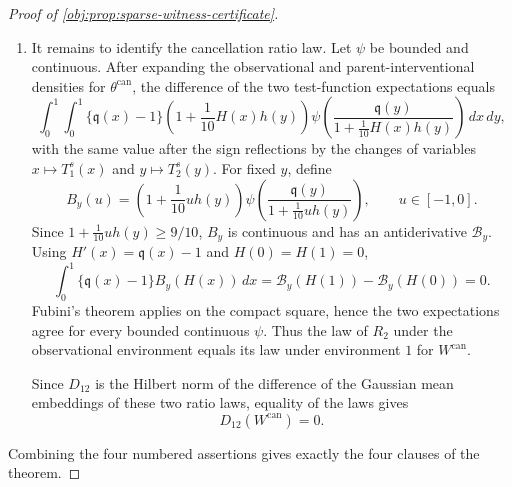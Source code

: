\documentclass[11pt]{article}
\begin{document}
\begin{proof}[Proof of \cref{obj:prop:sparse-witness-certificate}]
\begin{enumerate}
\item It remains to identify the cancellation ratio law.  Let \(\psi\) be bounded and continuous.  After expanding the observational and parent-interventional densities for \(\theta^{\mathrm{can}}\), the difference of the two test-function expectations equals
\[
\int_0^1\!\int_0^1
\{\mathfrak q(x)-1\}
\left(1+\frac1{10}H(x)h(y)\right)
\psi\!\left(
\frac{\mathfrak q(y)}
     {1+\frac1{10}H(x)h(y)}
\right)\,dx\,dy,
\]
with the same value after the sign reflections by the changes of variables \(x\mapsto T_1^s(x)\) and \(y\mapsto T_2^s(y)\).  For fixed \(y\), define
\[
B_y(u)=
\left(1+\frac1{10}u h(y)\right)
\psi\!\left(
\frac{\mathfrak q(y)}{1+\frac1{10}u h(y)}
\right),
\qquad u\in[-1,0].
\]
Since \(1+\frac1{10}u h(y)\ge9/10\), \(B_y\) is continuous and has an antiderivative \(\mathcal B_y\).  Using \(H'(x)=\mathfrak q(x)-1\) and \(H(0)=H(1)=0\),
\[
\int_0^1\{\mathfrak q(x)-1\}B_y(H(x))\,dx
=
\mathcal B_y(H(1))-\mathcal B_y(H(0))
=
0.
\]
Fubini's theorem applies on the compact square, hence the two expectations agree for every bounded continuous \(\psi\).  Thus the law of \(R_2\) under the observational environment equals its law under environment \(1\) for \(W^{\mathrm{can}}\). %

Since \(D_{12}\) is the Hilbert norm of the difference of the Gaussian mean embeddings of these two ratio laws, equality of the laws gives
\[
D_{12}(W^{\mathrm{can}})=0.
\]
\end{enumerate}

Combining the four numbered assertions gives exactly the four clauses of the theorem. %
\end{proof}
\end{document}
